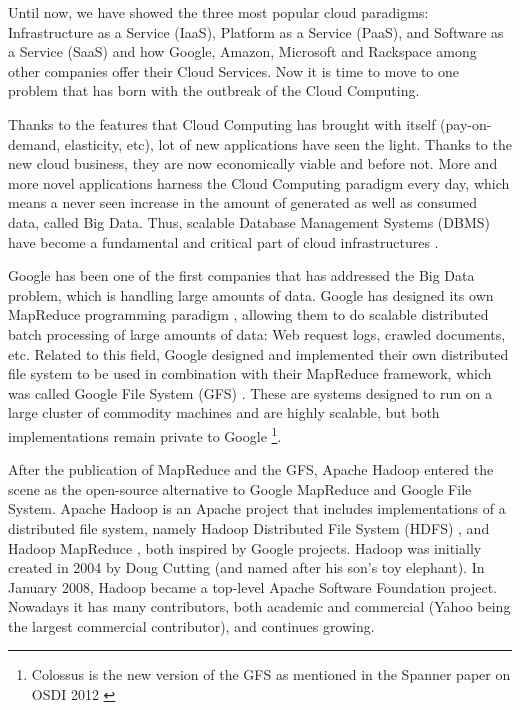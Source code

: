 Until now, we have showed the three most popular cloud paradigms: Infrastructure as a Service (IaaS), Platform as a Service (PaaS), and Software as a Service (SaaS) and how Google, Amazon, Microsoft and Rackspace among other companies offer their Cloud Services. Now it is time to move to one problem that has born with the outbreak of the Cloud Computing.
\par
Thanks to the features that Cloud Computing has brought with itself (pay-on-demand, elasticity, etc), lot of new applications have seen the light. Thanks to the new cloud business, they are now economically viable and before not. More and more novel applications harness the Cloud Computing paradigm every day, which means a never seen increase in the amount of generated as well as consumed data, called Big Data. Thus, scalable Database Management Systems (DBMS) have become a fundamental and critical part of cloud infrastructures \cite{agrawal2010big}.
\par
Google has been one of the first companies that has addressed the Big Data problem, which is handling large amounts of data. Google has designed its own MapReduce programming paradigm \cite{dean2008mapreduce}, allowing them to do scalable distributed batch processing of large amounts of data: Web request logs, crawled documents, etc. Related to this field, Google designed and implemented their own distributed file system to be used in combination with their MapReduce framework, which was called Google File System (GFS) \cite{ghemawat2003google}. These are systems designed to run on a large cluster of commodity machines and are highly scalable, but both implementations remain private to Google \footnote{Colossus is the new version of the GFS as mentioned in the Spanner paper on OSDI 2012 \cite{corbett2012spanner}}.
\par
After the publication of MapReduce and the GFS, Apache Hadoop \cite{ApacheHadoop} entered the scene as the open-source alternative to Google MapReduce and Google File System. Apache Hadoop is an Apache project that includes implementations of a distributed file system, namely Hadoop Distributed File System (HDFS)  \cite{white2012hadoop, shvachko2010hadoop}, and Hadoop MapReduce \cite{ApacheHadoop}, both inspired by Google projects. Hadoop was initially created in 2004 by Doug Cutting (and named after his son's toy elephant). In January 2008, Hadoop became a top-level Apache Software Foundation project. Nowadays it has many contributors, both academic and commercial (Yahoo being the largest commercial contributor), and continues growing.

